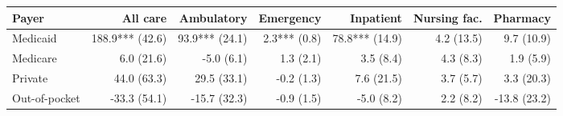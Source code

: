 \begin{tabular}{@{}l rrrrrr@{}}
\toprule
Payer & All care & Ambulatory & Emergency & Inpatient & Nursing fac. & Pharmacy \\
\midrule
Medicaid & 188.9*** (42.6) & 93.9*** (24.1) & 2.3*** (0.8) & 78.8*** (14.9) & 4.2 (13.5) & 9.7 (10.9) \\
Medicare & 6.0 (21.6) & -5.0 (6.1) & 1.3 (2.1) & 3.5 (8.4) & 4.3 (8.3) & 1.9 (5.9) \\
Private & 44.0 (63.3) & 29.5 (33.1) & -0.2 (1.3) & 7.6 (21.5) & 3.7 (5.7) & 3.3 (20.3) \\
Out-of-pocket & -33.3 (54.1) & -15.7 (32.3) & -0.9 (1.5) & -5.0 (8.2) & 2.2 (8.2) & -13.8 (23.2) \\
\bottomrule
\end{tabular}
